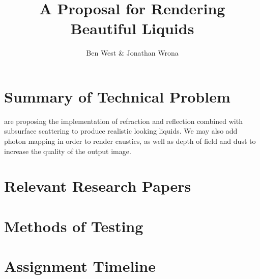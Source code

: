 \documentclass[journal, a4paper]{IEEEtran}
\begin{document}
    \title{A Proposal for Rendering Beautiful Liquids}
    \author{Ben West \& Jonathan Wrona}
    \maketitle

\section{Summary of Technical Problem}
     are proposing the implementation of refraction and reflection combined with subsurface scattering to produce realistic looking liquids. We may also add photon mapping in order to render caustics, as well as depth of field and dust to increase the quality of the output image.

\section{Relevant Research Papers}


\section{Methods of Testing}

\section{Assignment Timeline}
    


\end{document}

